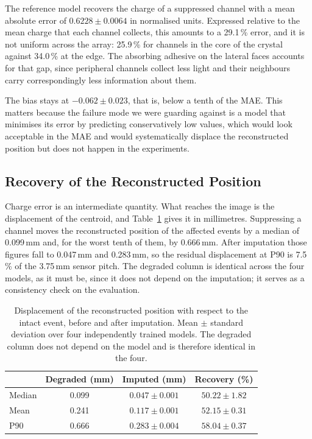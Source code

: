 \documentclass[10pt,conference]{IEEEtran}
\begin{document}
The reference model recovers the charge of a suppressed channel with a mean
absolute error of $0.6228 \pm 0.0064$ in normalised units. Expressed relative to
the mean charge that each channel collects, this amounts to a 29.1\,\% error,
and it is not uniform across the array: 25.9\,\% for channels in the core of the
crystal against 34.0\,\% at the edge. The absorbing adhesive on the lateral
faces accounts for that gap, since peripheral channels collect less light and
their neighbours carry correspondingly less information about them.

The bias stays at $-0.062 \pm 0.023$, that is, below a tenth of the MAE. This
matters because the failure mode we were guarding against is a model that
minimises its error by predicting conservatively low values, which would look
acceptable in the MAE and would systematically displace the reconstructed
position but does not happen in the experiments. 

\subsection{Recovery of the Reconstructed Position}
\label{sec:res-position}

Charge error is an intermediate quantity. What reaches the image is the
displacement of the centroid, and Table~\ref{tab:position} gives it in
millimetres. Suppressing a channel moves the reconstructed position of the
affected events by a median of 0.099\,mm and, for the worst tenth of them, by
0.666\,mm. After imputation those figures fall to 0.047\,mm and 0.283\,mm, so
the residual displacement at P90 is 7.5\,\% of the 3.75\,mm sensor pitch. The
degraded column is identical across the four models, as it must be, since it
does not depend on the imputation; it serves as a consistency check on the
evaluation.

\begin{table}[t]
\centering
\caption{Displacement of the reconstructed position with respect to the intact
event, before and after imputation. Mean $\pm$ standard deviation over four
independently trained models. The degraded column does not depend on the model
and is therefore identical in the four.}
\label{tab:position}
\begin{tabular}{@{}lccc@{}}
\toprule
 & \textbf{Degraded (mm)} & \textbf{Imputed (mm)} & \textbf{Recovery (\%)} \\
\midrule
Median & 0.099 & $0.047 \pm 0.001$ & $50.22 \pm 1.82$ \\
Mean   & 0.241 & $0.117 \pm 0.001$ & $52.15 \pm 0.31$ \\
P90    & 0.666 & $0.283 \pm 0.004$ & $58.04 \pm 0.37$ \\
\bottomrule
\end{tabular}
\end{table}
\end{document}
